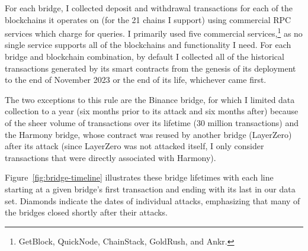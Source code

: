 For each bridge, I collected deposit and withdrawal transactions for
each of the blockchains it operates on (for the 21 chains I
support) using commercial RPC services which charge for queries.  I
primarily used five commercial services,\footnote{%
GetBlock, QuickNode, ChainStack, GoldRush, and Ankr.} 
as no single service supports
all of the blockchains and functionality I need.
For each bridge and blockchain combination, by default I
collected all of the historical transactions generated by its smart
contracts from the genesis of its deployment to the end of November
2023 or the end of its life, whichever came first.

The two exceptions to this rule are the Binance bridge, for which I
limited data collection to a year (six months prior to its attack and
six months after) because of the sheer volume of transactions over its
lifetime (30 million transactions) and the Harmony bridge, whose
contract was reused by another bridge (LayerZero) after its attack
(since LayerZero was not attacked itself, I only consider transactions that were directly associated with Harmony).


%
%

Figure~\ref{fig:bridge-timeline} illustrates these bridge lifetimes
with each line starting at a given bridge's first transaction and
ending with its last in our data set.  Diamonds indicate the dates of
individual attacks, emphasizing that many of the bridges closed
shortly after their attacks.
